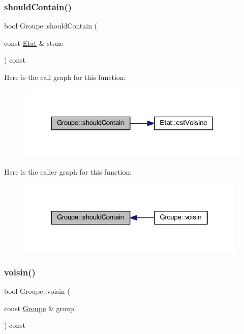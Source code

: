\subsubsection{\texorpdfstring{should\+Contain()}{shouldContain()}}
{\footnotesize\ttfamily bool Groupe\+::should\+Contain (\begin{DoxyParamCaption}\item[{const \hyperlink{class_etat}{Etat} \&}]{stone }\end{DoxyParamCaption}) const}

Here is the call graph for this function\+:\nopagebreak
\begin{figure}[H]
\begin{center}
\leavevmode
\includegraphics[width=318pt]{class_groupe_a51ae2500f67ac071215ba3ff49e91b17_cgraph}
\end{center}
\end{figure}
Here is the caller graph for this function\+:\nopagebreak
\begin{figure}[H]
\begin{center}
\leavevmode
\includegraphics[width=310pt]{class_groupe_a51ae2500f67ac071215ba3ff49e91b17_icgraph}
\end{center}
\end{figure}
\mbox{\label{class_groupe_a13537bf2de72a097dd9ee102d14686d5}} 
\subsubsection{\texorpdfstring{voisin()}{voisin()}}
{\footnotesize\ttfamily bool Groupe\+::voisin (\begin{DoxyParamCaption}\item[{const \hyperlink{class_groupe}{Groupe} \&}]{group }\end{DoxyParamCaption}) const}

